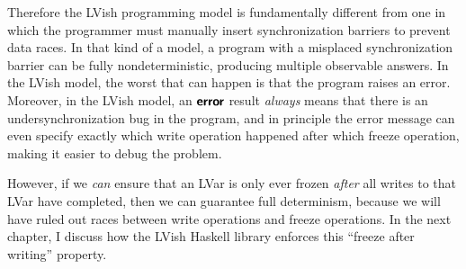 Therefore the LVish programming model is fundamentally different from
one in which the programmer must manually insert synchronization
barriers to prevent data races.  In that kind of a model, a program
with a misplaced synchronization barrier can be fully
nondeterministic, producing multiple observable answers.  In the LVish
model, the worst that can happen is that the program raises an error.
Moreover, in the LVish model, an $\textbf{\textsf{error}}$ result \emph{always} means
that there is an undersynchronization bug in the program, and in
principle the error message can even specify exactly which write
operation happened after which freeze operation, making it easier to
debug the problem.

However, if we \emph{can} ensure that an LVar is only ever frozen
\emph{after} all writes to that LVar have completed, then we can
guarantee full determinism, because we will have ruled out races
between write operations and freeze operations.  In the next chapter,
I discuss how the LVish Haskell library enforces this ``freeze after
writing'' property.
